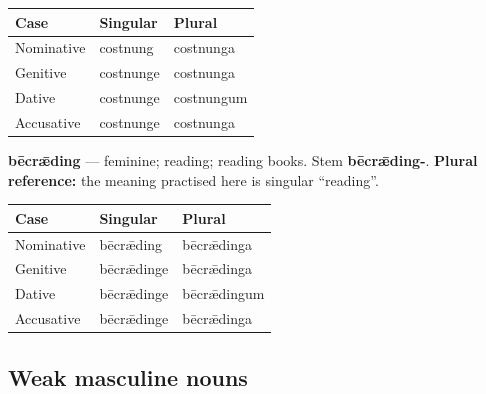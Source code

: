 \par\begingroup
\fontsize{10.5}{13.2}\selectfont
\setlength{\LTleft}{0pt}\setlength{\LTright}{\fill}
\noindent
\begin{tabular}{@{}>{\raggedright\arraybackslash}p{39.46mm}>{\raggedright\arraybackslash}p{39.46mm}>{\raggedright\arraybackslash}p{39.46mm}@{}}
\toprule
\textbf{Case} & \textbf{Singular} & \textbf{Plural} \\
\midrule
Nominative & costnung & costnunga \\
Genitive & costnunge & costnunga \\
Dative & costnunge & costnungum \\
Accusative & costnunge & costnunga \\
\bottomrule
\end{tabular}
\par\endgroup

\textbf{bēcrǣding} — feminine; reading; reading books. Stem \textbf{bēcrǣding-}. \textbf{Plural reference:} the meaning practised here is singular “reading”.

\par\begingroup
\fontsize{10.5}{13.2}\selectfont
\setlength{\LTleft}{0pt}\setlength{\LTright}{\fill}
\noindent
\begin{tabular}{@{}>{\raggedright\arraybackslash}p{38.19mm}>{\raggedright\arraybackslash}p{38.19mm}>{\raggedright\arraybackslash}p{42.0mm}@{}}
\toprule
\textbf{Case} & \textbf{Singular} & \textbf{Plural} \\
\midrule
Nominative & bēcrǣding & bēcrǣdinga \\
Genitive & bēcrǣdinge & bēcrǣdinga \\
Dative & bēcrǣdinge & bēcrǣdingum \\
Accusative & bēcrǣdinge & bēcrǣdinga \\
\bottomrule
\end{tabular}
\par\endgroup

\subsection*{Weak masculine nouns}

